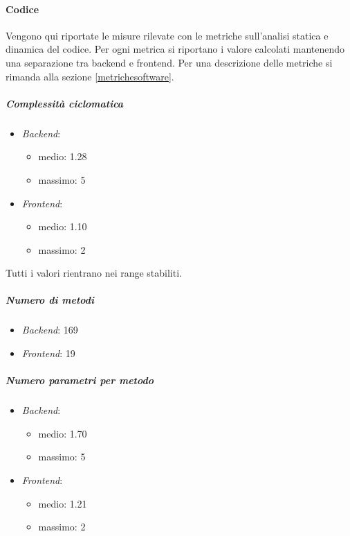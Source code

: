 	\paragraph{Codice}
	Vengono qui riportate le misure rilevate con le metriche sull'analisi statica e dinamica del codice. Per ogni metrica si riportano i valore calcolati mantenendo una separazione tra backend e frontend. Per una descrizione delle metriche si rimanda alla sezione \ref{metrichesoftware}.

	\subparagraph{Complessità ciclomatica}
	\begin{itemize}
		\item \emph{Backend}: 
		\begin{itemize}
			\item medio: 1.28
			\item massimo: 5
		\end{itemize} 
		\item \emph{Frontend}: 
		\begin{itemize}
			\item medio: 1.10
			\item massimo: 2
		\end{itemize} 
	\end{itemize}

	Tutti i valori rientrano nei range stabiliti.


	\subparagraph{Numero di metodi}
	\begin{itemize}
		\item \emph{Backend}: 169
		\item \emph{Frontend}: 19
	\end{itemize}
	 	

	\subparagraph{Numero parametri per metodo}
	\begin{itemize}
		\item \emph{Backend}: 
		\begin{itemize}
			\item medio: 1.70
			\item massimo: 5
		\end{itemize} 
		\item \emph{Frontend}: 
		\begin{itemize}
			\item medio: 1.21
			\item massimo: 2
		\end{itemize} 
	\end{itemize}

